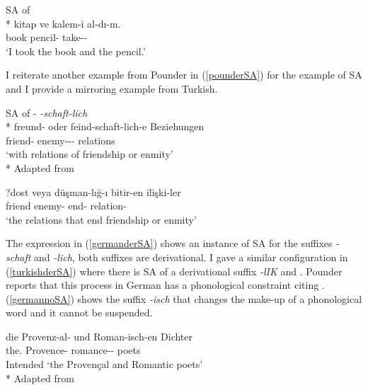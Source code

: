 \begin{exe}
    \ex \label{recuperand} SA of {\Acc} \\*
    \gll kitap ve kalem-i al-dı-m. \\
    book {\And} pencil-{\Acc} take-{\Pst}-{\Fsg} \\ 
    \glt `I took the book and the pencil.'
\end{exe}

I reiterate another example from Pounder in (\ref{pounderSA}) for the example of SA and I provide a mirroring example from Turkish.

\begin{exe}
    \ex \label{pounderSA}
    \begin{xlist}
        \ex \label{germanderSA} SA of {\Der-\Der} \textit{-schaft-lich}\\*
        \gll freund- oder feind-schaft-lich-e Beziehungen \\ 
        friend- {\Or} enemy-{\Der}-{\Der}-{\Pl} relations \\
        \glt `with relations of friendship or enmity' \\*
        \hfill Adapted from \citet{pounder2006broken}
        
        \ex \label{turkishderSA} 
        \gll ?dost veya düşman-lığ-ı bitir-en ilişki-ler \\ 
        friend {\Or} enemy-{\Der} end-{\Fp} relation-{\Pl} \\
        \glt `the relations that end friendship or enmity'
    \end{xlist}
\end{exe}

The expression in (\ref{germanderSA}) shows an instance of SA for the suffixes \textit{-schaft} and \textit{-lich}, both suffixes are derivational. I gave a similar configuration in (\ref{turkishderSA}) where there is SA of a derivational suffix \textit{-lIK} and {\Acc}. Pounder reports that this process in German has a phonological constraint citing \citet{smith2000word}. 
(\ref{germannoSA}) shows the suffix {\Der} \textit{-isch} that changes the make-up of a phonological word and it cannot be suspended.

\begin{exe}
    \ex \label{germannoSA}
    \gll *die Provenz-al- und Roman-isch-en Dichter \\ 
    the.{\Pl} Provence-{\Der} {\And} romance-{\Der}-{\Pl} poets \\
    \glt Intended `the Provençal and Romantic poets'\\*
    \hfill Adapted from \citet{pounder2006broken}
\end{exe}

